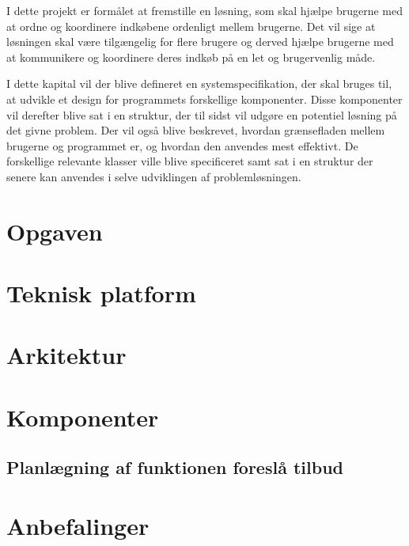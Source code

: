 I dette projekt er formålet at fremstille en løsning, som skal hjælpe brugerne med at ordne og koordinere indkøbene ordenligt mellem brugerne. Det vil sige at løsningen skal være tilgængelig for flere brugere og derved hjælpe brugerne med at kommunikere og koordinere deres indkøb på en let og brugervenlig måde.

I dette kapital vil der blive defineret en systemspecifikation, der skal bruges til, at udvikle et design for programmets forskellige komponenter. Disse komponenter vil derefter blive sat i en struktur, der til sidst vil udgøre en potentiel løsning på det givne problem. Der vil også blive beskrevet, hvordan grænsefladen mellem brugerne og programmet er, og hvordan den anvendes mest effektivt.
De forskellige relevante klasser ville blive specificeret samt sat i en struktur der senere kan anvendes i selve udviklingen af problemløsningen.

\section{Opgaven} %


%

\section{Teknisk platform}


%

\section{Arkitektur}


\section{Komponenter}


\subsection{Planlægning af funktionen foreslå tilbud}


\section{Anbefalinger}

